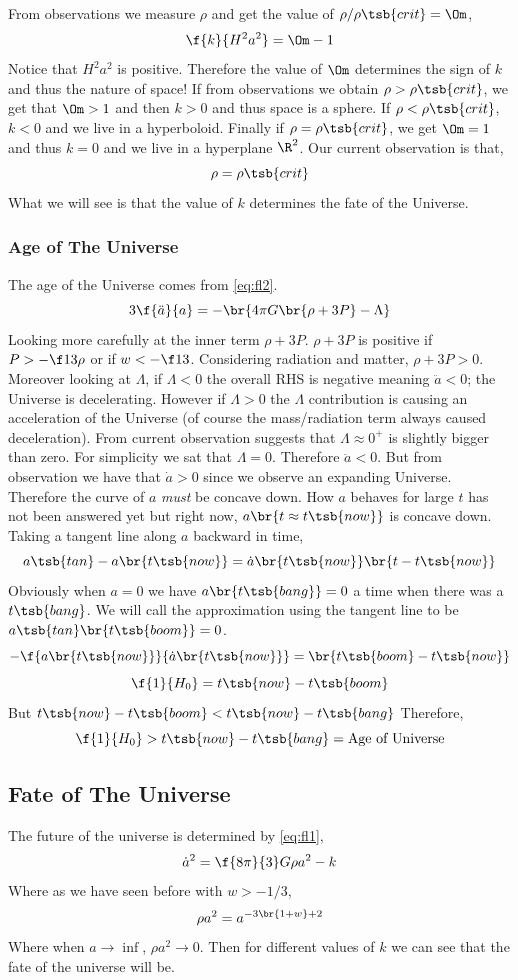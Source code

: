 \documentclass{article}
\begin{document}
From observations we measure $\rho$ and get the value of $\rho/\rho\tsb{crit} = \Om$,
\[ \f{k}{H^2 a^2} = \Om - 1 \]
Notice that $H^2 a^2$ is positive. Therefore the value of $\Om$ determines the sign of $k$ and thus the nature of space! If from observations we obtain $\rho > \rho\tsb{crit}$, we get that $\Om > 1$ and then $k > 0$ and thus space is a sphere. If $\rho < \rho\tsb{crit}$, $k < 0$ and we live in a hyperboloid. Finally if $\rho = \rho\tsb{crit}$, we get $\Om = 1$ and thus $k = 0$ and we live in a hyperplane $\R^2$. Our current observation is that,
\[ \rho = \rho\tsb{crit} \]
What we will see is that the value of $k$ determines the fate of the Universe.

\subsubsection{Age of The Universe}
The age of the Universe comes from \eqref{eq:fl2}.
\[ 3 \f{\ddot{a}}{a} = - \br{4 \pi G\br{\rho + 3 P} - \Lambda} \]
Looking more carefully at the inner term $\rho + 3 P$. $\rho + 3 P$ is positive if $P > -\f13 \rho$ or if $w < -\f13$. Considering radiation and matter, $\rho + 3 P > 0$. Moreover looking at $\Lambda$, if $\Lambda < 0$ the overall RHS is negative meaning $\ddot{a} < 0$; the Universe is decelerating. However if $\Lambda > 0$ the $\Lambda$ contribution is causing an acceleration of the Universe (of course the mass/radiation term always caused deceleration). From current observation suggests that $\Lambda \approx 0^+$ is slightly bigger than zero. For simplicity we sat that $\Lambda = 0$. Therefore $\ddot{a} < 0$. But from observation we have that $\dot{a} > 0$ since we observe an expanding Universe. Therefore the curve of $a$ \textit{must} be concave down. How $a$ behaves for large $t$ has not been answered yet but right now, $a\br{t \approx t\tsb{now}}$ is concave down. Taking a tangent line along $a$ backward in time,
\[ a\tsb{tan} - a\br{t\tsb{now}} = \dot{a}\br{t\tsb{now}}\br{t - t\tsb{now}}  \]
Obviously when $a = 0$ we have $a\br{t\tsb{bang}} = 0$ a time when there was a $t\tsb{bang}$. We will call the approximation using the tangent line to be $a\tsb{tan}\br{t\tsb{boom}} = 0$.
\[ -\f{a\br{t\tsb{now}}}{\dot{a}\br{t\tsb{now}}} = \br{t\tsb{boom} - t\tsb{now}} \]
\[ \f{1}{H_0} = t\tsb{now} - t\tsb{boom} \]
But $t\tsb{now} - t\tsb{boom} < t\tsb{now} - t\tsb{bang}$
Therefore,
\[ \f{1}{H_0} > t\tsb{now} - t\tsb{bang} = \text{Age of Universe} \]

\subsection{Fate of The Universe}
The future of the universe is determined by \eqref{eq:fl1},
\[ \dot{a}^2 = \f{8\pi}{3}G \rho a^2 - k \]
Where as we have seen before with $w > -1/3$,
\[ \rho a^2 = a^{-3 \br{1 + w} + 2} \]
Where when $a \to \inf$, $\rho a^2 \to 0$. Then for different values of $k$ we can see that the fate of the universe will be. \\
\end{document}
